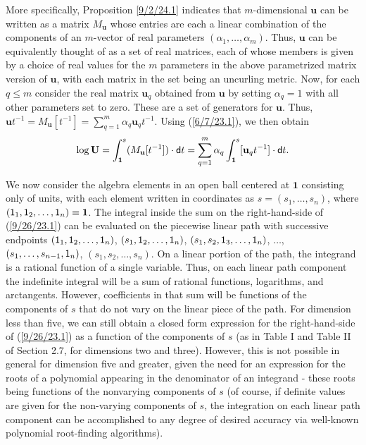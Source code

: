 \documentclass{amsart}
\numberwithin{equation}{section}
\theoremstyle{definition}
\numberwithin{theorem}{section}
\begin{document}
More specifically, Proposition \ref{9/2/24.1} indicates that $m$-dimensional $\mathbf{u}$ can be written as a matrix $M_\mathbf{u}$ whose entries are each a linear combination of the components of an $m$-vector of real parameters $(\alpha_1, \dots, \alpha_m)$.   Thus, $\mathbf{u}$ can be equivalently thought of as a set of real matrices, each of whose members is given by a choice of real values for the $m$ parameters in the above parametrized matrix version of $\mathbf{u}$, with each matrix in the set being an uncurling metric.  Now, for each $q\le m$ consider the real matrix  $\mathbf{u}_q$ obtained from $\mathbf{u}$ by setting $\alpha_q =1$ with all other parameters set to zero.  These are a set of generators for $\mathbf{u}$. Thus, $\mathbf{u}t^{-1} = M_{\mathbf{u}}[t^{-1}] = \sum_{q=1}^m \alpha_q \mathbf{u}_q t^{-1}$.   Using (\ref{6/7/23.1}), we then obtain \begin{equation}\label{9/26/23.1} \log  \mathbf{U} = \int_{\mathbf{1}}^s (M_{\mathbf{u}} [t^{-1}])\cdot {\sf d}t =\sum_{q=1}^m \alpha_q \int_{\mathbf{1}}^s [\mathbf{u}_q t^{-1}]\cdot {\sf d}t.\end{equation}  

We now consider the algebra elements in an open ball centered at $\mathbf{1}$ consisting only of units, with each element written in coordinates as $s = (s_1,\dots,s_n)$, where $({\sf 1}_1,{\sf 1}_2,\dots,{\sf 1}_n) \equiv \mathbf{1}$.  The integral inside the sum on the right-hand-side of (\ref{9/26/23.1}) can be evaluated on the piecewise linear path with successive endpoints $({\sf 1}_1,{\sf 1}_2,\dots,{\sf 1}_n)$, $(s_1,{\sf 1}_2,\dots,{\sf 1}_n)$, $(s_1,s_2,{\sf 1}_3,\dots,{\sf 1}_n)$,  $\dots$, $(s_1,\dots, s_{n-1}, {\sf 1}_n)$, $(s_1,s_2,\dots,s_n)$.    On a linear portion of the path, the integrand is a rational function of a single variable.  Thus, on each linear path component the indefinite integral will be a sum of rational functions, logarithms, and arctangents.  However, coefficients in that sum will be functions of the components of $s$ that do not vary on the linear piece of the path.  For dimension less than five, we can still obtain a closed form expression for the right-hand-side of (\ref{9/26/23.1}) as a function of the components of $s$ (as in Table I and Table II of Section 2.7, for dimensions two and three).  However, this is not possible in general for dimension five and greater, given the need for an expression for the roots of a polynomial appearing in the denominator of an integrand - these roots being functions of the nonvarying components of $s$ (of course, if definite values are given for the non-varying components of $s$, the integration on each linear path component can be accomplished to any degree of desired accuracy via well-known polynomial root-finding algorithms).
\end{document}
